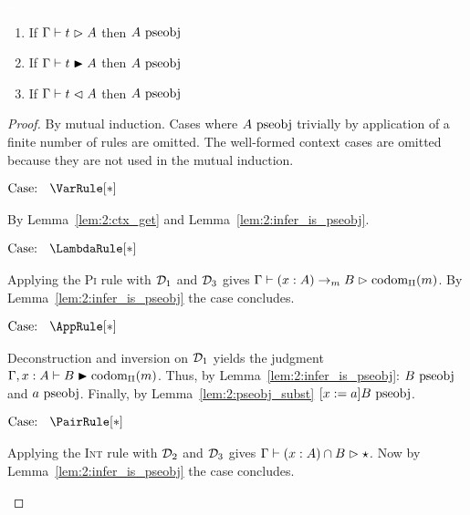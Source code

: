 \begin{lemma}
    \textcolor{white}{\_}
    \begin{enumerate}
        \item If $\Gamma \vdash t \vartriangleright A$ then $A~\mbox{\normalfont pseobj}$
        \item If $\Gamma \vdash t \blacktriangleright A$ then $A~\mbox{\normalfont pseobj}$
        \item If $\Gamma \vdash t \vartriangleleft A$ then $A~\mbox{\normalfont pseobj}$
    \end{enumerate}
    \label{lem:2:infer_type_is_pseobj}
\end{lemma}
\begin{proof}
    By mutual induction.
    Cases where $A~\mbox{\normalfont pseobj}$ trivially by application of a finite number of rules are omitted.
    The well-formed context cases are omitted because they are not used in the mutual induction.

    $\text{Case: }\begin{array}{c} \VarRule[*] \end{array}$
    \begin{proofcase}
        By Lemma~\ref{lem:2:ctx_get} and Lemma~\ref{lem:2:infer_is_pseobj}.
    \end{proofcase}

    $\text{Case: }\begin{array}{c} \LambdaRule[*] \end{array}$
    \begin{proofcase}
        Applying the \textsc{Pi} rule with $\mathcal{D}_{1}$ and $\mathcal{D}_{3}$ gives $\Gamma \vdash (x : A) \to_m B \vartriangleright \mbox{\normalfont codom}_\Pi(m)$.
        By Lemma~\ref{lem:2:infer_is_pseobj} the case concludes.
    \end{proofcase}

    $\text{Case: }\begin{array}{c} \AppRule[*] \end{array}$
    \begin{proofcase}
        Deconstruction and inversion on $\mathcal{D}_{1}$ yields the judgment $\Gamma, x : A \vdash B \blacktriangleright \mbox{\normalfont codom}_\Pi(m)$.
        Thus, by Lemma~\ref{lem:2:infer_is_pseobj}: $B~\mbox{\normalfont pseobj}$ and $a~\mbox{\normalfont pseobj}$.
        Finally, by Lemma~\ref{lem:2:pseobj_subst} $[x := a]B~\mbox{\normalfont pseobj}$.
    \end{proofcase}

    $\text{Case: }\begin{array}{c} \PairRule[*] \end{array}$
    \begin{proofcase}
        Applying the \textsc{Int} rule with $\mathcal{D}_{2}$ and $\mathcal{D}_{3}$ gives $\Gamma \vdash (x : A) \cap B \vartriangleright \star$.
        Now by Lemma~\ref{lem:2:infer_is_pseobj} the case concludes.
    \end{proofcase}


\end{proof}
